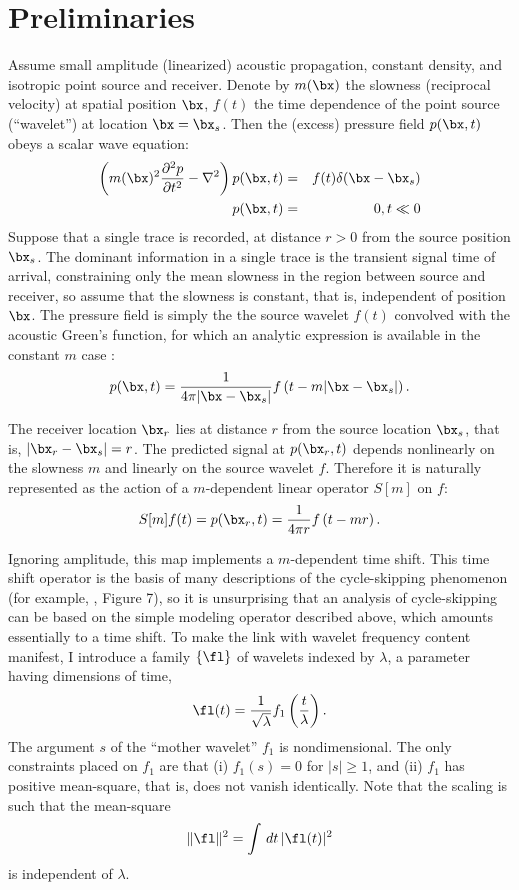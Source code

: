 \section{Preliminaries}
Assume small amplitude (linearized) acoustic propagation, constant
density, and isotropic point source and receiver. Denote by $m(\bx)$
the slowness (reciprocal velocity) at spatial position $\bx$, $f(t)$
the time dependence of the point source (``wavelet'') at location
$\bx=\bx_s$. Then the (excess) pressure field $p(\bx,t)$ obeys a
scalar wave equation:
\begin{eqnarray}
  \label{eqn:awe}
  \left(m(\bx)^2\frac{\partial^2 p}{\partial t^2} - \nabla^2\right) p(\bx,t) &=&
                                                                         f(t)\delta(\bx-\bx_s) \nonumber\\
  p(\bx,t)&=&0, t\ll 0
\end{eqnarray}
Suppose that a single trace is recorded, at distance $r>0$ from the
source position $\bx_s$. The dominant information in a single
trace is the transient signal time of arrival, constraining only the mean slowness in the
region
between source and receiver, so assume that the
slowness is constant, that is, independent of position $\bx$. The pressure field is simply the  the source
wavelet $f(t)$ convolved with the
acoustic Green's function, for which an analytic expression is
available in the constant $m$ case \cite[]{CourHil:62}:
\begin{equation}
  \label{eqn:homsol}
  p(\bx,t) = \frac{1}{4\pi |\bx-\bx_s|}f\left(t-m|\bx-\bx_s|\right).
\end{equation}

The receiver location $\bx_r$ lies at distance $r$ from the source
location $\bx_s$, that is, $|\bx_r-\bx_s|=r$. The predicted signal at
$p(\bx_r,t)$ depends nonlinearly on the slowness $m$ and linearly on the
source wavelet $f$. Therefore it is naturally represented as the
action of a $m$-dependent linear operator $S[m]$ on $f$:
\begin{equation}
\label{eqn:mod}
S[m]f (t)= p(\bx_r,t) = \frac{1}{4\pi r}f\left(t-mr\right).
\end{equation}

Ignoring amplitude, this map implements a $m$-dependent time
shift. This time shift operator is the basis of many descriptions of
the cycle-skipping phenomenon (for example, \cite{VirieuxOperto:09},
Figure 7), so it is unsurprising that an analysis of cycle-skipping
can be based on the simple modeling operator described above, which
amounts essentially to a time shift. To make the link with wavelet
frequency content manifest, I introduce a family $\{\fl\}$ of
wavelets indexed by $\lambda$, a parameter having dimensions of time,
\begin{equation}
  \label{eqn:deffl}
  \fl(t) = \frac{1}{\sqrt{\lambda}}f_1\left(\frac{t}{\lambda}\right).
\end{equation}
The argument $s$ of the ``mother wavelet'' $f_1$ is
nondimensional. The only constraints placed on $f_1$ are that (i) 
$f_1(s)=0$ for $|s|\ge 1$, and (ii) $f_1$  has positive
mean-square, that is, does not vanish identically. Note that
the scaling is such that the mean-square
\[
  \|\fl\|^2 = \int\,dt\,|\fl(t)|^2
\]
is independent of $\lambda$.


